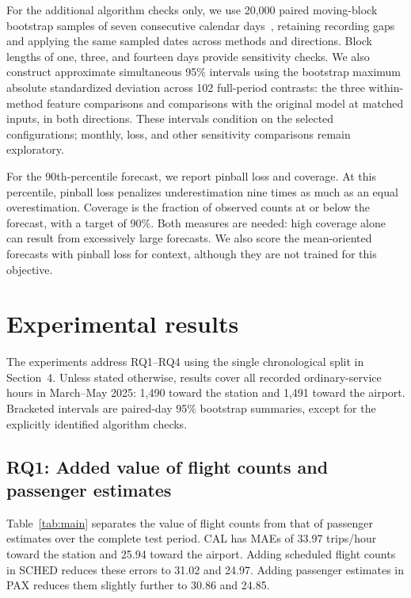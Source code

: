 \documentclass[preprint,12pt,times]{elsarticle}
\begin{document}
For the additional algorithm checks only, we use 20,000 paired moving-block bootstrap samples of seven consecutive calendar days~\cite{blockbootstrap}, retaining recording gaps and applying the same sampled dates across methods and directions. Block lengths of one, three, and fourteen days provide sensitivity checks. We also construct approximate simultaneous 95\% intervals using the bootstrap maximum absolute standardized deviation across 102 full-period contrasts: the three within-method feature comparisons and comparisons with the original model at matched inputs, in both directions. These intervals condition on the selected configurations; monthly, loss, and other sensitivity comparisons remain exploratory.

For the 90th-percentile forecast, we report pinball loss and coverage. At this percentile, pinball loss penalizes underestimation nine times as much as an equal overestimation. Coverage is the fraction of observed counts at or below the forecast, with a target of 90\%. Both measures are needed: high coverage alone can result from excessively large forecasts. We also score the mean-oriented forecasts with pinball loss for context, although they are not trained for this objective.

\section{Experimental results}
The experiments address RQ1--RQ4 using the single chronological split in Section~4. Unless stated otherwise, results cover all recorded ordinary-service hours in March--May 2025: 1,490 toward the station and 1,491 toward the airport. Bracketed intervals are paired-day 95\% bootstrap summaries, except for the explicitly identified algorithm checks.

\subsection{RQ1: Added value of flight counts and passenger estimates}
Table~\ref{tab:main} separates the value of flight counts from that of passenger estimates over the complete test period. CAL has MAEs of 33.97 trips/hour toward the station and 25.94 toward the airport. Adding scheduled flight counts in SCHED reduces these errors to 31.02 and 24.97. Adding passenger estimates in PAX reduces them slightly further to 30.86 and 24.85.
\end{document}
